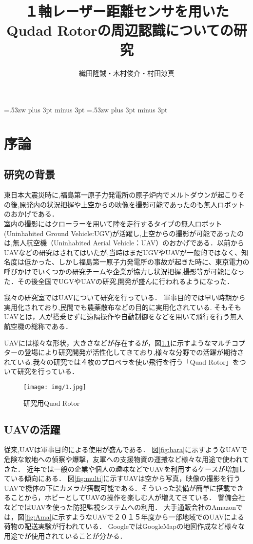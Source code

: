 \documentclass[12pt,oneside]{sotsuken_paper}
\title{１軸レーザー距離センサを用いたQudad Rotorの周辺認識についての研究}
\author{織田隆誠・木村俊介・村田涼真}
\begin{document}
\setlength{\baselineskip}{9truemm}

\kanjiskip=.53zw plus 3pt minus 3pt
\xkanjiskip=.53zw plus 3pt minus 3pt

\tableofcontents


\chapter{序論}
\section{研究の背景}
東日本大震災時に,福島第一原子力発電所の原子炉内でメルトダウンが起こりその後,原発内の状況把握や上空からの映像を撮影可能であったのも無人ロボットのおかげである．\\室内の撮影にはクローラーを用いて陸を走行するタイプの無人ロボット(Uninhabited Ground Vehicle:UGV)が活躍し,上空からの撮影が可能であったのは,無人航空機（Uninhabited Aerial Vehicle：UAV）のおかげである．以前からUAVなどの研究はされてはいたが,当時はまだUGVやUAVが一般的ではなく、知名度は低かった、しかし福島第一原子力発電所の事故が起きた時に、東京電力の呼びかけでいくつかの研究チームや企業が協力し状況把握,撮影等が可能になった．その後全国でUGVやUAVの研究,開発が盛んに行われるようになった．


我々の研究室ではUAVについて研究を行っている．
軍事目的では早い時期から実用化されており,民間でも農薬散布などの目的に実用化されている.
そもそもUAVとは，人が搭乗せずに遠隔操作や自動制御をなどを用いて飛行を行う無人航空機の総称である\cite{hirokawa2007}．


UAVには様々な形状，大きさなどが存在するが，図\ref{fig:1}に示すようなマルチコプターの登場により研究開発が活性化してきており,様々な分野での活躍が期待されている.我々の研究では４枚のプロペラを使い飛行を行う「Quad Rotor」をついて研究を行っている．

\begin{figure}[H]
\begin{center}
\texttt{[image: img/1.jpg]}
\end{center}
\caption{研究用Quad Rotor}
\label{fig:1}
\end{figure}

\section{UAVの活躍}
従来,UAVは軍事目的による使用が盛んである．
図\ref{fig:hara}に示すようなUAVで危険な敵地への偵察や爆撃，友軍への支援物資の運搬など様々な用途で使われてきた．
近年では一般の企業や個人の趣味などでUAVを利用するケースが増加している傾向にある．
図\ref{fig:multi}に示すUAVは空から写真，映像の撮影を行うUAVで機体の下にカメラが搭載可能である．そういった装備が簡単に搭載できることから，ホビーとしてUAVの操作を楽しむ人が増えてきている．
警備会社などではUAVを使った防犯監視システムへの利用．
大手通販会社のAmazonでは，図\ref{fig:Ama}に示すようなUAVで２０１５年度から一部地域でのUAVによる荷物の配送実験が行われている．
GoogleではGoogleMapの地図作成など様々な用途でが使用されていることが分かる．
\end{document}
